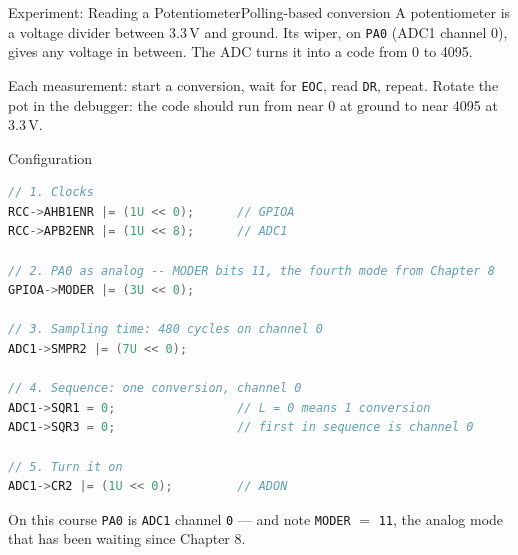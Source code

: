 \documentclass[9pt,aspectratio=169,xcolor=table]{beamer}
\begin{document}
\begin{frame}{Experiment: Reading a Potentiometer}{Polling-based conversion}
    \leavevmode
    {\small A potentiometer is a voltage divider between 3.3\,V and ground. Its wiper, on \texttt{PA0} (ADC1 channel 0), gives any voltage in between. The ADC turns it into a code from 0 to 4095.}

    \vspace{3mm}
    \begin{center}
    \end{center}

    \vspace{4mm}
    {\small Each measurement: start a conversion, wait for \texttt{EOC}, read \texttt{DR}, repeat. Rotate the pot in the debugger: the code should run from near 0 at ground to near 4095 at 3.3\,V.}
\end{frame}

\begin{frame}[fragile]{Configuration}
\begin{lstlisting}[language=C, basicstyle=\ttfamily\scriptsize]
// 1. Clocks
RCC->AHB1ENR |= (1U << 0);      // GPIOA
RCC->APB2ENR |= (1U << 8);      // ADC1

// 2. PA0 as analog -- MODER bits 11, the fourth mode from Chapter 8
GPIOA->MODER |= (3U << 0);

// 3. Sampling time: 480 cycles on channel 0
ADC1->SMPR2 |= (7U << 0);

// 4. Sequence: one conversion, channel 0
ADC1->SQR1 = 0;                 // L = 0 means 1 conversion
ADC1->SQR3 = 0;                 // first in sequence is channel 0

// 5. Turn it on
ADC1->CR2 |= (1U << 0);         // ADON
\end{lstlisting}

    \vspace{1mm}
    {\small On this course \texttt{PA0} is \texttt{ADC1} channel \texttt{0} ---
    and note \texttt{MODER} $=$ \texttt{11}, the analog mode that has been waiting
    since Chapter 8.}
\end{frame}
\end{document}
